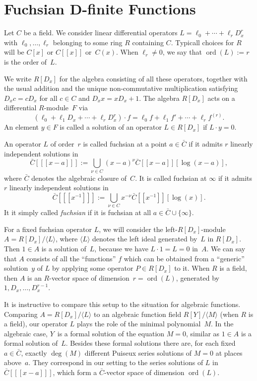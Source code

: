 \documentclass{sig-alternate}
\def\ord{\operatorname{ord}}
\def\<#1>{\langle#1\rangle}
\begin{document}
\section{Fuchsian D-finite Functions}

Let $C$ be a field. We consider linear differential operators
$L=\ell_0+\cdots+\ell_rD_x^r$ with $\ell_0,\dots,\ell_r$ belonging to some ring
$R$ containing $C$.
Typicall choices for $R$ will be $C[x]$ or $C[[x]]$ or~$C(x)$.
When $\ell_r\neq0$, we say that $\ord(L):=r$ is the order of~$L$.

We write $R[D_x]$ for the algebra consisting of all these operators, together
with the usual addition and the unique non-commutative multiplication satisfying
$D_xc=cD_x$ for all $c\in C$ and $D_xx=xD_x+1$.
The algebra $R[D_x]$ acts on a differential $R$-module~$F$ via
\[
  (\ell_0+\ell_1D_x+\cdots+\ell_rD_x^r)\cdot f=
   \ell_0f + \ell_1f' + \cdots + \ell_r f^{(r)}.
\]
An element $y\in F$ is called a solution of an operator $L\in R[D_x]$ if
$L\cdot y=0$.

An operator $L$ of order~$r$ is called fuchsian at a point $a\in\bar C$ if
it admits $r$ linearly independent solutions in
\[
  \bar C[[[x-a]]] := \bigcup_{\nu\in C} (x-a)^\nu\bar C[[x-a]][\log(x-a)],
\]
where $\bar C$ denotes the algebraic closure of~$C$. It is called fuchsian
at $\infty$ if it admits $r$ linearly independent solutions in
\[
  \bar C[[[x^{-1}]]] := \bigcup_{\nu\in C} x^{-\nu} \bar C[[x^{-1}]][\log(x)].
\]
It it simply called \emph{fuchsian} if it is fuchsian at all $a\in\bar C\cup\{\infty\}$.

For a fixed fuchsian operator $L$, we will consider the left-$R[D_x]$-module
$A=R[D_x]/\<L>$, where $\<L>$ denotes the left ideal generated by~$L$ in
$R[D_x]$.  Then $1\in A$ is a solution of~$L$, because we have $L\cdot 1=L=0$
in~$A$. We can say that $A$ consists of all the ``functions'' $f$ which can be
obtained from a ``generic'' solution~$y$ of $L$ by applying some operator $P\in
R[D_x]$ to it. When $R$ is a field, then $A$ is an $R$-vector space of
dimension~$r=\ord(L)$, generated by $1,D_x,\dots,D_x^{r-1}$.

It is instructive to compare this setup to the situation for algebraic
functions. Comparing $A=R[D_x]/\<L>$ to an algebraic function field $R[Y]/\<M>$
(when $R$ is a field), our operator $L$ plays the role of the minimal
polynomial~$M$. In the algebraic case, $Y$~is a formal solution of the equation
$M=0$, similar as $1\in A$ is a formal solution of~$L$. Besides these formal
solutions there are, for each fixed $a\in\bar C$, exactly $\deg(M)$ different
Puiseux series solutions of $M=0$ at places above~$a$. They correspond in our
setting to the series solutions of $L$ in $\bar C[[[x-a]]]$, which form a $\bar
C$-vector space of dimension $\ord(L)$.
\end{document}
